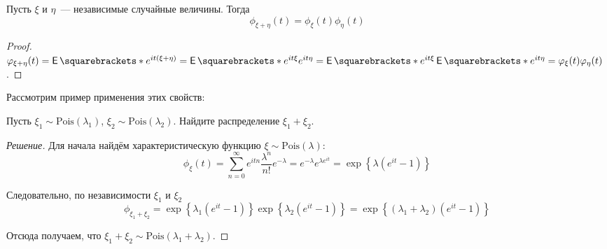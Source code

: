 \begin{property}
	Пусть \(\xi\) и \(\eta\)~--- независимые случайные величины. Тогда
	\[
		\phi_{\xi + \eta}(t) = \phi_{\xi}(t)\phi_{\eta}(t)
	\]
\end{property}
\begin{proof}
	\(\phi_{\xi + \eta}(t) = \E{e^{it(\xi + \eta)}} = \E{e^{it\xi}e^{it\eta}} = \E{e^{it\xi}}\E{e^{it\eta}} = \phi_{\xi}(t)\phi_{\eta}(t)\).
\end{proof}

Рассмотрим пример применения этих свойств:
\begin{problem}
	Пусть \(\xi_1 \sim \mathrm{Pois}(\lambda_1)\), \(\xi_2 \sim \mathrm{Pois}(\lambda_2)\). Найдите распределение \(\xi_1 + \xi_2\).
\end{problem}
\begin{proof}[Решение]
	Для начала найдём характеристическую функцию \(\xi \sim \mathrm{Pois}(\lambda)\):
	\[
		\phi_{\xi}(t) = \sum_{n = 0}^{\infty} 
		e^{itn}\frac{\lambda^n}{n!}e^{-\lambda} = e^{-\lambda}e^{\lambda 
		e^{it}} = \exp\left\{\lambda(e^{it} - 1)\right\}
	\]
	
	Следовательно, по независимости \(\xi_1\) и \(\xi_2\)
	\[
		\phi_{\xi_1 + \xi_2} = \exp\left\{\lambda_1(e^{it} - 1)\right\}\exp\left\{\lambda_2(e^{it} - 1)\right\} = \exp\left\{(\lambda_1 + \lambda_2)(e^{it} - 1)\right\}
	\]
	
	Отсюда получаем, что \(\xi_1 + \xi_2 \sim \mathrm{Pois}(\lambda_1 + \lambda_2)\).
\end{proof}